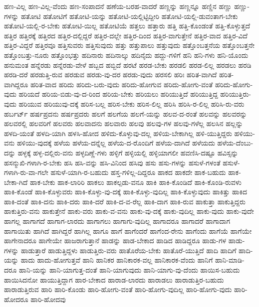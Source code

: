 {ಹಣ-ವಿಲ್ಲ
ಹಣ-ವಿಲ್ಲ-ವೆಂದು
ಹಣ-ಸಂಪಾದನೆ
ಹಣೆಯ-ಬರಹ-ವಾದರೆ
ಹಣ್ಣನ್ನು
ಹಣ್ಣನ್ನೂ
ಹಣ್ಣಿನ
ಹಣ್ಣು
ಹಣ್ಣು-ಗಳನ್ನು
ಹತೋಟಿ
ಹತೋಟಿಗೆ
ಹತೋಟಿ-ಯನ್ನು
ಹತೋಟಿ-ಯಲ್ಲಿಟ್ಟಿದ್ದೀರಿ
ಹತೋಟಿ-ಯಲ್ಲಿ-ಡುವಂತಾಗ-ಬೇಕು
ಹತೋಟಿ-ಯಲ್ಲಿ-ರ-ಬೇಕು
ಹತೋಟಿ-ಯಿಲ್ಲ
ಹತೋಟಿಯೆ
ಹತ್ತಲು
ಹತ್ತಾರು
ಹತ್ತಿ
ಹತ್ತಿ-ಕೊಂಡಂತೆ
ಹತ್ತಿ-ಕೊಳ್ಳುತ್ತದೆ
ಹತ್ತಿರ
ಹತ್ತಿರಕ್ಕೆ
ಹತ್ತಿರದ
ಹತ್ತಿರ-ದಲ್ಲಿದ್ದರೆ
ಹತ್ತಿರ-ದಲ್ಲೇ
ಹತ್ತಿರ-ದಿಂದ
ಹತ್ತಿರ-ವಾಗುತ್ತೇನೆ
ಹತ್ತಿರ-ವಾದ
ಹತ್ತಿರ-ವಿದೆ
ಹತ್ತಿರ-ವಿದ್ದರೆ
ಹತ್ತಿರವೂ
ಹತ್ತಿಸುವರು
ಹತ್ತಿಸುವುದು
ಹತ್ತು
ಹತ್ತುಪಾಲು
ಹತ್ತುವುದು
ಹತ್ತೊಂಬತ್ತನೆಯ
ಹತ್ತೊಂಬತ್ತನೇ
ಹತ್ತೊಂಬತ್ತು-ನೂರು
ಹತ್ತೊಂಭತ್ತು
ಹದಿನಾರು
ಹದಿನಾಲ್ಕು
ಹದಿನೈದು
ಹದ್ದು-ಗಳಿಗೆ
ಹನಿ
ಹನಿ-ಗಳು
ಹನಿ-ಯೊಂದು
ಹನುಮಂತ
ಹನ್ನೆರಡು
ಹನ್ನೆರಡು-ವೇಳೆ
ಹಬ್ಬದ
ಹಬ್ಬಿದೆ
ಹರಟೆ
ಹರಡ-ಬೇಕು
ಹರಡಲಿ
ಹರಡ-ಲಿಲ್ಲ
ಹರಡಲು
ಹರಡಿ
ಹರಡಿ-ದರೆ
ಹರಡುತ್ತಿ-ರುವ
ಹರಡುವ
ಹರಡು-ವು-ದರ
ಹರಡು-ವುದು
ಹರಸಲಿ
ಹರಿಃ
ಹರಿತ-ವಾಗಿದೆ
ಹರಿತ-ವಾಗಿದ್ದರೂ
ಹರಿತ-ವಾದ
ಹರಿದು
ಹರಿದು-ಬರು-ವುದು
ಹರಿದು-ಹೋಗುವ
ಹರಿದು-ಹೋಗು-ವಂತೆ
ಹರಿದು-ಹೋಗು-ವುದು
ಹರಿಯದೆ
ಹರಿಯ-ಬಿಡು-ವು-ದ-ರಿಂದ
ಹರಿಯ-ಬೇಕು
ಹರಿಯಲು
ಹರಿಯುತ್ತಿದೆ
ಹರಿಯುತ್ತಿದ್ದ
ಹರಿಯುತ್ತಿರು-ವುದು
ಹರಿಯುವ
ಹರಿಯುವು-ದಕ್ಕೆ
ಹರಿಸ-ಬಲ್ಲ
ಹರಿಸ-ಬೇಕು
ಹರಿಸ-ಲಿಲ್ಲ
ಹರಿಸಿ
ಹರಿಸಿ-ರ-ಲಿಲ್ಲ
ಹರಿಸಿ-ರು-ವರು
ಹರ್ಬರ್ಟ್
ಹರ್ಷಪ್ರದನು
ಹರ್ಷಪ್ರದರು
ಹಲಗೆ
ಹಲಗೆಯ
ಹಲಗೆ-ಯನ್ನು
ಹಲವ-ದ-ರಂತೆ
ಹಲವನ್ನು
ಹಲವರನ್ನು
ಹಲವರಲ್ಲಿ
ಹಲವರಿಗೆ
ಹಲವರು
ಹಲವಾದನು
ಹಲವಾರು
ಹಲವು
ಹಲವು-ಗಳ
ಹಲವು-ಗಳೆಲ್ಲ
ಹಲಸಿನ
ಹಲ್ಲನ್ನು
ಹಳದಿ-ಯಂತೆ
ಹಳದಿ-ಯಾಗಿ
ಹಳಸಿ-ಹೋದ
ಹಳಿದು-ಕೊಳ್ಳುವು-ದಲ್ಲ
ಹಳಿಯ-ಬೇಕಾಗಿಲ್ಲ
ಹಳಿ-ಯುತ್ತಿದ್ದರು
ಹಳಿಯು-ವನು
ಹಳಿಯು-ವುದಕ್ಕೆ
ಹಳೆಯ
ಹಳೆಯ-ದನ್ನೆಲ್ಲ
ಹಳೆಯ-ದ-ರೊಂದಿಗೆ
ಹಳೆಯ-ದಾಗಿದೆ
ಹಳೆಯದು
ಹಳೆಯ-ದೆಂಬು-ದನ್ನು
ಹಳ್ಳಕ್ಕೆ
ಹಳ್ಳ-ದಲ್ಲಿರು-ವನು
ಹಳ್ಳದಿಣ್ಣೆ-ಗಳು
ಹಳ್ಳಿಗೆ
ಹಳ್ಳಿಯಲ್ಲಿ
ಹಳ್ಳಿಯಾಗಲೀ
ಹವಣಿಸಿ-ದಷ್ಟೂ
ಹವಿಸ್ಸನ್ನು
ಹಸನ್ಮುಖಿ-ಗಳಾಗಿ-ರ-ಬೇಕು
ಹಸಿ
ಹಸಿ-ವನ್ನು
ಹಸಿ-ವಿನಿಂದ
ಹಸಿವು
ಹಸು
ಹಸು-ಗಳನ್ನು
ಹಸುಳೆ-ಗಳಂತೆ
ಹಸುಳೆ-ಗಳಾಗಿ-ರು-ವಾ-ಗಲೇ
ಹಸುಳೆ-ಯಾಗಿ-ರ-ಬಹುದು
ಹಸ್ತ-ಗಳಿಲ್ಲ-ದಿದ್ದರೂ
ಹಾಕದ
ಹಾಕದೇ
ಹಾಕ-ಬಹುದು
ಹಾಕ-ಬೇಕಾ-ಗಿದೆ
ಹಾಕ-ಬೇಕು
ಹಾಕ-ಲಾರಿರಿ
ಹಾಕಲು
ಹಾಕಲ್ಪಡು-ವನೂ
ಹಾಕಿ
ಹಾಕಿ-ಕೊಂಡಿದೆ
ಹಾಕಿ-ಕೊಂಡಿ-ರುವಳು
ಹಾಕಿ-ಕೊಂಡೆ
ಹಾಕಿ-ಕೊಳ್ಳುವರು
ಹಾಕಿ-ಕೊಳ್ಳು-ವು-ದಕ್ಕೆ
ಹಾಕಿ-ಕೊಳ್ಳು-ವುದಿಲ್ಲ
ಹಾಕಿ-ಕೊಳ್ಳುವುದು
ಹಾಕಿತ್ತು
ಹಾಕಿದ
ಹಾಕಿ-ದಂತೆ
ಹಾಕಿ-ದನು
ಹಾಕಿ-ದರು
ಹಾಕಿ-ದರೆ
ಹಾಕಿ-ದ-ವ-ರೆಲ್ಲ
ಹಾಕಿ-ದಾಗ
ಹಾಕಿ-ರುವ
ಹಾಕುತ್ತಾ
ಹಾಕುತ್ತಿದ್ದರು
ಹಾಕುತ್ತಿರು-ವನು
ಹಾಕುತ್ತೇನೆ
ಹಾಕು-ವರು
ಹಾಕು-ವ-ವನು
ಹಾಕು-ವು-ದಕ್ಕೆ
ಹಾಕು-ವುದಿಲ್ಲ
ಹಾಕು-ವುದು
ಹಾಕು-ವುದೇ
ಹಾಗಲ್ಲ
ಹಾಗಾಗದೆ
ಹಾಗಾಗ-ಲಾರದು
ಹಾಗಾಗಲು
ಹಾಗಾಗು-ವುದಿಲ್ಲ
ಹಾಗಾದರೂ
ಹಾಗಾದರೆ
ಹಾಗಾದಾಗ
ಹಾಗಾಯಿತು
ಹಾಗಿದೆ
ಹಾಗಿದ್ದರೆ
ಹಾಗಿಲ್ಲ
ಹಾಗೂ
ಹಾಗೆ
ಹಾಗೆಂದರೆ
ಹಾಗೆಂದ-ರೇನು
ಹಾಗೆಂದು
ಹಾಗೆಯೆ
ಹಾಗೆಯೇ
ಹಾಗೇನಾದರೂ
ಹಾಗೇಯೇ
ಹಾಜರಾಗುತ್ತಾನೆ
ಹಾಡನ್ನು
ಹಾಡ-ಬೇಕಾದ
ಹಾಡಿದ
ಹಾಡಿದ್ದರೂ
ಹಾಡು-ಗಳ
ಹಾಡು-ಗಳನ್ನು
ಹಾಡುತ್ತಾರೆ
ಹಾಡುತ್ತಿದ್ದಳು
ಹಾಡುತ್ತಿರು-ವರು
ಹಾತೊರೆಯ-ಬೇಕು
ಹಾತೊರೆ-ಯುತ್ತಿದೆ
ಹಾದಿ
ಹಾದಿಗೆ
ಹಾದಿ-ಯನ್ನು
ಹಾದು
ಹಾದು-ಹೋಗುತ್ತವೆ
ಹಾನಿ
ಹಾನಿಕರ
ಹಾನಿಕಾರಕ-ವಲ್ಲ
ಹಾನಿಕಾರಕ-ವೆಂದು
ಹಾನಿಗೆ
ಹಾನಿ-ಮಾಡಿ-ದರೂ
ಹಾನಿ-ಯನ್ನು
ಹಾನಿ-ಯಾಗುತ್ತ-ದಂತೆ
ಹಾನಿ-ಯಾಗುವುದು
ಹಾನಿ-ಯಾಗು-ವು-ದೆಂದು
ಹಾಯಿಸ-ಬಹುದು
ಹಾಯಿಸಿದನೋ
ಹಾಯುತ್ತಿದ್ದಾಗ
ಹಾರ-ಬೇಕಾದ
ಹಾರಾಡ-ಲಾರದು
ಹಾರಾಡಲು
ಹಾರಾಡುತ್ತಿರ-ಬಹುದು
ಹಾರಾಡುತ್ತಿರುವ
ಹಾರಿ
ಹಾರಿ-ಕೊಂಡು
ಹಾರಿ-ಹೋಗು-ವಂತೆ
ಹಾರಿ-ಹೋಗು-ವುದಿಲ್ಲ
ಹಾರಿ-ಹೋಗು-ವುದು
ಹಾರಿ-ಹೋದರೂ
ಹಾರಿ-ಹೋದವು
}
